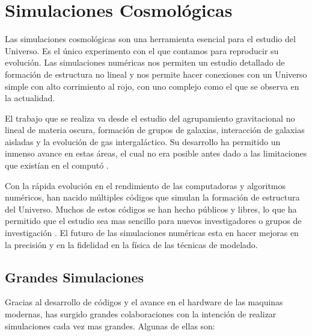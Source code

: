 
\chapter{Simulaciones Cosmológicas}
\label{chap:2 Sim}
\setcounter{equation}{0}

\noindent Las simulaciones cosmológicas son una herramienta esencial para el estudio del Universo. Es el único experimento con el que contamos para reproducir su evolución. Las simulaciones numéricas nos permiten un estudio detallado de formación de estructura no lineal y nos permite hacer conexiones con un Universo simple con alto corrimiento al rojo, con uno complejo como el que se observa en la actualidad.

El trabajo que se realiza va desde el estudio del agrupamiento gravitacional no lineal de materia oscura, formación de grupos de galaxias, interacción de galaxias aisladas y la evolución de gas intergaláctico. Su desarrollo ha permitido un inmenso avance en estas áreas, el cual no era posible antes dado a las limitaciones que existían en el computó \cite{2001NewA....6...79S}.


Con la rápida evolución en el rendimiento de las computadoras y algoritmos numéricos, han nacido múltiples códigos que simulan la formación de estructura del Universo. Muchos de estos códigos se han hecho públicos y libres, lo que ha permitido que el estudio sea mas sencillo para nuevos investigadores o grupos de investigación \cite{2021MNRAS.506.2871S}. El futuro de las simulaciones numéricas esta en hacer mejoras en la precisión y en la fidelidad en la física de las técnicas de modelado.

\newpage

\section{Grandes Simulaciones}

Gracias al desarrollo de códigos y el avance en el hardware de las maquinas modernas, has surgido grandes colaboraciones con la intención de realizar simulaciones cada vez mas grandes. Algunas de ellas son:


